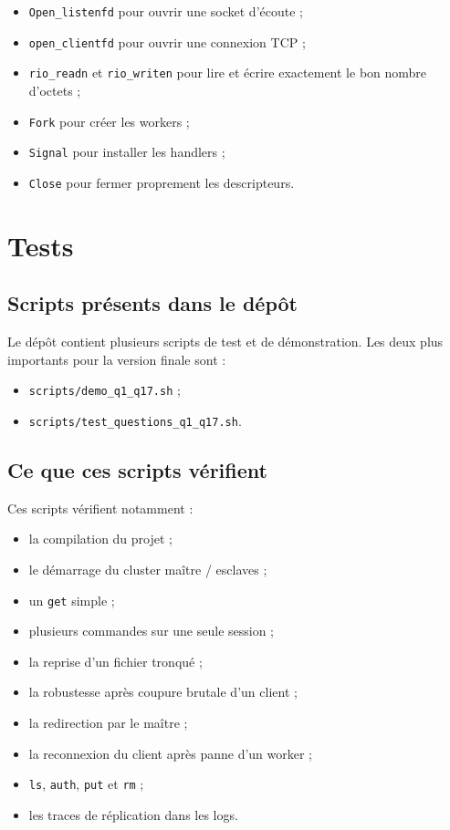 \documentclass[a4paper,11pt]{article}
\begin{document}
\begin{itemize}[leftmargin=*]
    \item \texttt{Open\_listenfd} pour ouvrir une socket d'écoute ;
    \item \texttt{open\_clientfd} pour ouvrir une connexion TCP ;
    \item \texttt{rio\_readn} et \texttt{rio\_writen} pour lire et écrire exactement le bon nombre d'octets ;
    \item \texttt{Fork} pour créer les workers ;
    \item \texttt{Signal} pour installer les handlers ;
    \item \texttt{Close} pour fermer proprement les descripteurs.
\end{itemize}
\newpage
\section{Tests}

\subsection{Scripts présents dans le dépôt}

Le dépôt contient plusieurs scripts de test et de démonstration. Les deux plus
importants pour la version finale sont :

\begin{itemize}[leftmargin=*]
    \item \texttt{scripts/demo\_q1\_q17.sh} ;
    \item \texttt{scripts/test\_questions\_q1\_q17.sh}.
\end{itemize}

\subsection{Ce que ces scripts vérifient}

Ces scripts vérifient notamment :

\begin{itemize}[leftmargin=*]
    \item la compilation du projet ;
    \item le démarrage du cluster maître / esclaves ;
    \item un \texttt{get} simple ;
    \item plusieurs commandes sur une seule session ;
    \item la reprise d'un fichier tronqué ;
    \item la robustesse après coupure brutale d'un client ;
    \item la redirection par le maître ;
    \item la reconnexion du client après panne d'un worker ;
    \item \texttt{ls}, \texttt{auth}, \texttt{put} et \texttt{rm} ;
    \item les traces de réplication dans les logs.
\end{itemize}
\end{document}
